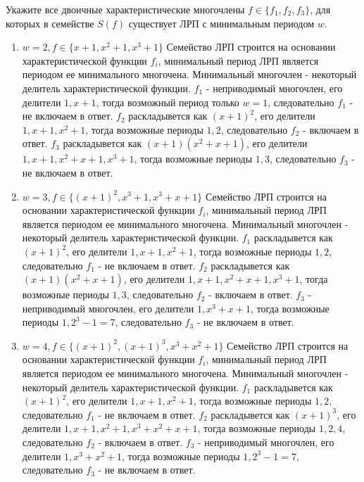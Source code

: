 \documentclass[utf8x, 14pt]{G7-32} %
\begin{document}
Укажите все двоичные характеристические многочлены $f\in\{f_1, f_2, f_3\}$, для которых в семействе $S(f)$ существует ЛРП с минимальным периодом $w$.

\begin{enumerate}
    \item $w=2, f\in \{x+1, x^2+1, x^3+1\}$
    Семейство ЛРП строится на основании характеристической функции $f_i$, минимальный период ЛРП является периодом ее минимального многочена. Минимальный многочлен - некоторый делитель характеристической функции. $f_1$ - неприводимый многочлен, его делители $1, x+1$, тогда возможный период только $w=1$, следовательно $f_1$ - не включаем в ответ. $f_2$ раскладывется как $(x+1)^2$, его делители $1, x+1, x^2+1$, тогда возможные периоды $1, 2$, следовательно $f_2$ - включаем в ответ. $f_3$ раскладывется как $(x+1)(x^2+x+1)$, его делители $1, x+1, x^2+x+1, x^3+1$, тогда возможные периоды $1, 3$, следовательно $f_3$ - не включаем в ответ. 
    
    \item $w=3, f\in \{(x+1)^2, x^3+1, x^3+x+1\}$
    Семейство ЛРП строится на основании характеристической функции $f_i$, минимальный период ЛРП является периодом ее минимального многочена. Минимальный многочлен - некоторый делитель характеристической функции. $f_1$ раскладывется как $(x+1)^2$, его делители $1, x+1, x^2+1$, тогда возможные периоды $1, 2$, следовательно $f_1$ - не включаем в ответ. $f_2$ раскладывется как $(x+1)(x^2+x+1)$, его делители $1, x+1, x^2+x+1, x^3+1$, тогда возможные периоды $1, 3$, следовательно $f_2$ - включаем в ответ. $f_3$ - неприводимый многочлен, его делители $1, x^3+x+1$, тогда возможные периоды $1, 2^3-1=7$, следовательно $f_3$ - не включаем в ответ. 
    
    \item $w=4, f\in \{(x+1)^2, (x+1)^3, x^3+x^2+1\}$
    Семейство ЛРП строится на основании характеристической функции $f_i$, минимальный период ЛРП является периодом ее минимального многочена. Минимальный многочлен - некоторый делитель характеристической функции. $f_1$ раскладывется как $(x+1)^2$, его делители $1, x+1, x^2+1$, тогда возможные периоды $1, 2$, следовательно $f_1$ - не включаем в ответ. $f_2$ раскладывется как $(x+1)^3$, его делители $1, x+1, x^2+1, x^3+x^2+x+1$, тогда возможные периоды $1, 2, 4$, следовательно $f_2$ - включаем в ответ. $f_3$ - неприводимый многочлен, его делители $1, x^3+x^2+1$, тогда возможные периоды $1, 2^3-1=7$, следовательно $f_3$ - не включаем в ответ. 
    

\end{enumerate}
\end{document}
